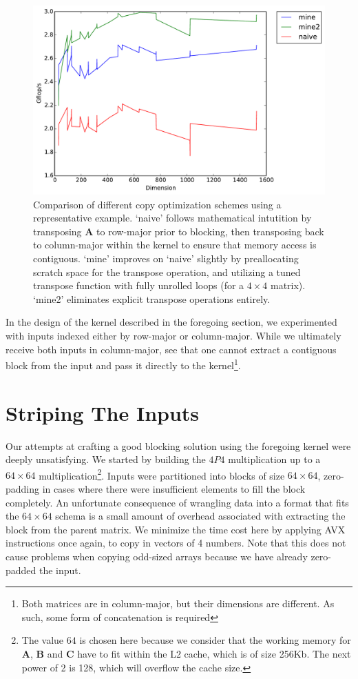 \documentclass{scrartcl}
\begin{document}
  \begin{figure}[ht!]
    \centering
    \includegraphics[width=\textwidth]{timing-malloc-comparison}
    \caption{Comparison of different copy optimization schemes using a representative example. `naive' follows mathematical intutition by transposing $\mathbf{A}$ to row-major prior to blocking, then transposing back to column-major within the kernel to ensure that memory access is contiguous. `mine' improves on `naive' slightly by preallocating scratch space for the transpose operation, and utilizing a tuned transpose function with fully unrolled loops (for a $4 \times 4$ matrix). `mine2' eliminates explicit transpose operations entirely.\label{fig:avx-2}}
  \end{figure}

  In the design of the kernel described in the foregoing section, we experimented with inputs indexed either by row-major or column-major. While we ultimately receive both inputs in column-major, see that one cannot extract a contiguous block from the input and pass it directly to the kernel\footnote{Both matrices are in column-major, but their dimensions are different. As such, some form of concatenation is required}.

  \section{Striping The Inputs}
  Our attempts at crafting a good blocking solution using the foregoing kernel were deeply unsatisfying. We started by building the $4P4$ multiplication up to a $64 \times 64$ multiplication\footnote{The value $64$ is chosen here because we consider that the working memory for $\mathbf{A}$, $\mathbf{B}$ and $\mathbf{C}$ have to fit within the L2 cache, which is of size 256Kb. The next power of 2 is 128, which will overflow the cache size.}. Inputs were partitioned into blocks of size $64 \times 64$, zero-padding in cases where there were insufficient elements to fill the block completely. An unfortunate consequence of wrangling data into a format that fits the $64 \times 64$ schema is a small amount of overhead associated with extracting the block from the parent matrix. We minimize the time cost here by applying AVX instructions once again, to copy in vectors of 4 numbers. Note that this does not cause problems when copying odd-sized arrays because we have already zero-padded the input.
\end{document}
